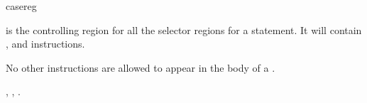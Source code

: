\begin{instruction}{casereg}
  \begin{notes}
     is the controlling region for all the selector
    regions for a  statement.  It will contain
    ,  and
     instructions.

    No other instructions are allowed to appear in the body of a
    .
  \end{notes}

  \nresults

  \begin{operands}
  \item {}
  \end{operands}

  \begin{seealso}
    , ,
    .
  \end{seealso}
\end{instruction}

